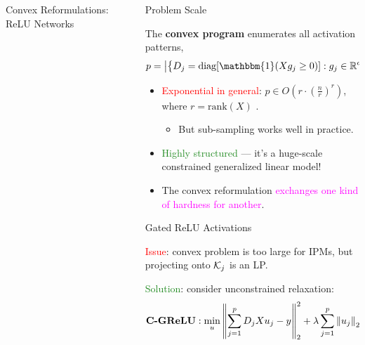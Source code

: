 \documentclass[12pt, usenames, dvipsnames]{beamer}
\newlength{\sepwidth}
\newlength{\colwidth}
\newcommand{\separatorcolumn}{\begin{column}{\sepwidth}\end{column}}
\newcommand{\red}[1]{\textcolor{Red}{#1}}
\newcommand{\green}[1]{\textcolor{ForestGreen}{#1}}
\newcommand{\purple}[1]{\textcolor{Magenta}{#1}}
\begin{document}
\begin{frame}[t]
\begin{columns}[t]
\begin{column}{\colwidth}
\begin{block}{Convex Reformulations: ReLU Networks}
\begin{columns}[t]
				\end{columns}

			\end{block}


		\end{column}

		\separatorcolumn

		\begin{column}{\colwidth}

			\vspace{-1.5em}
			\begin{block}{Problem Scale}
				\large

				The \textbf{convex program} enumerates all activation patterns,
				\vspace{0.5em}
				\[
					p = \abs{\cbr{D_j = \text{diag}[\mathbbm{1}(X g_j \geq 0)] : g_j \in \R^d }}.
				\]
				\vspace{-1em}
				\begin{itemize}
					\item \red{Exponential in general}: \( p \in O(r \cdot (\frac{n}{r})^r) \),
					      where \( r = \text{rank}(X) \) \citep{winder1966partitions}.
					      \begin{itemize}
						      \item \large But sub-sampling works well in practice.
					      \end{itemize}
					      \vspace{0.1em}

					\item \green{Highly structured} --- it's a huge-scale constrained generalized linear model!

					\item The convex reformulation \purple{exchanges one kind of hardness for another}.
				\end{itemize}
			\end{block}

			\vspace{-1em}
			\begin{block}{Gated ReLU Activations}
				\large

				\red{Issue}: convex problem is too large for IPMs, but projecting onto \( \mathcal{K}_j \) is an LP.

				\green{Solution}: consider unconstrained relaxation:
				\[
					\begin{aligned}
						\textbf{C-GReLU}: \min_{u} & \left\|\sum_{j=1}^p D_j X u_j - y\right\|_2^2 +
						\lambda \sum_{j=1}^p \left\|u_j\right\|_2                                    \\
					\end{aligned}
				\]


\end{block}
\end{column}
\end{columns}
\end{frame}
\end{document}
